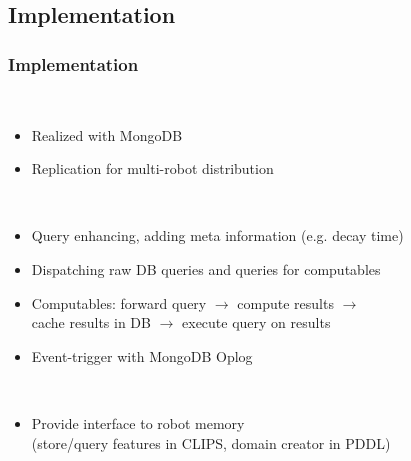 \subsection{Implementation}
\begin{frame}
  \frametitle{Implementation}
  \begin{description}[]
  \item[Back-End] \hfill \\
    \begin{itemize}
    \item Realized with MongoDB
    \item Replication for multi-robot distribution
    \end{itemize}
  \smallskip
  \item[Robot Memory] \hfill \\
    \begin{itemize}
    \item Query enhancing, adding meta information (e.g. decay time)
    \item Dispatching raw DB queries and queries for computables
    \item Computables: forward query $\rightarrow$ compute results $\rightarrow$ \\
          cache results in DB $\rightarrow$ execute query on results
    \item Event-trigger with MongoDB Oplog
    \end{itemize}
  \smallskip
  \item[Planner/Reasoner] \hfill \\
    \begin{itemize}
    \item Provide interface to robot memory\\
          (store/query features in CLIPS, domain creator in PDDL)
    \end{itemize}
  \end{description}  
\end{frame}

